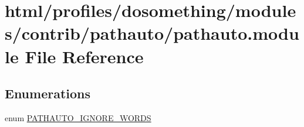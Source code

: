 \hypertarget{pathauto_8module}{
\section{html/profiles/dosomething/modules/contrib/pathauto/pathauto.module File Reference}
\label{pathauto_8module}
}
\subsection*{Enumerations}
\begin{DoxyCompactItemize}
\item 
enum \hyperlink{pathauto_8module_aacdee2c23d53cfb17f6b217d0e1d6f2e}{PATHAUTO\_\-IGNORE\_\-WORDS} 
\end{DoxyCompactItemize}
